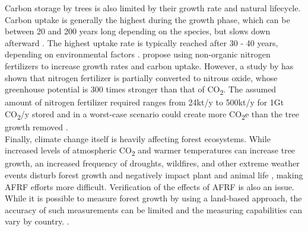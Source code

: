 Carbon storage by trees is also limited by their growth rate and natural lifecycle. Carbon uptake is generally the highest during the growth phase, which can be between 20 and 200 years long depending on the species, but slows down afterward \parencite{Watson2000LandForestry}. The highest uptake rate is typically reached after 30 - 40 years, depending on environmental factors \parencite{NationalResearchCouncil2015ClimateSequestration}. \textcite{Watson2000LandForestry} propose using non-organic nitrogen fertilizers to increase growth rates and carbon uptake. However, a study by \textcite{Crutzen2008AtmosphericPhysics} has shown that nitrogen fertilizer is partially converted to nitrous oxide, whose greenhouse potential is 300 times stronger than that of CO\textsubscript{2}. The assumed amount of nitrogen fertilizer required ranges from 24kt/y \parencite{Rau2013DirectProduction} to 500kt/y \parencite{Dipple2021TheSystems} for 1Gt CO\textsubscript{2}/y stored and in a worst-case scenario could create more CO\textsubscript{2}e than the tree growth removed \parencite{NationalResearchCouncil2015ClimateSequestration}.\\Finally, climate change itself is heavily affecting forest ecosystems. While increased levels of atmospheric CO\textsubscript{2} and warmer temperatures can increase tree growth, an increased frequency of droughts, wildfires, and other extreme weather events  disturb forest growth and negatively impact plant and animal life \parencite{EPA2015ClimateForests}, making AFRF efforts more difficult.
Verification of the effects of AFRF is also an issue. While it is possible to measure forest growth by using a land-based approach, the accuracy of such measurements can be limited and the measuring capabilities can vary by country. \parencite{Watson2000LandForestry}.
